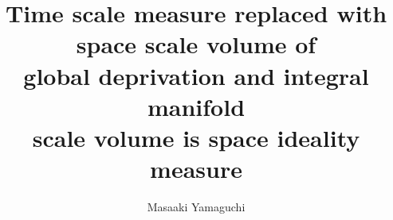 \documentclass{jsarticle}
\begin{document}
\title{Time scale measure replaced with space scale volume of \\
global deprivation and integral manifold \\
scale volume is space ideality measure}
\author{Masaaki Yamaguchi}
\date{}
\maketitle

\newcommand{\variint}{%
	\begin{picture}(15,30)
		\put(0,0){
			$ \iint $}
		\put(0,5){\line(15,0){15}}
	\end{picture} %
}
   \newcommand{\squareiint}{%
	\begin{picture}(15,30)
		\put(0,0){
			$ \iint $}
		\put(0,5){$\text{\scalebox{2.0}[1]{$\square$}}$}
	\end{picture} %
}

  
   \newcommand{\dazanier}{%
	\begin{picture}(15,30)
		\put(0,0){
			$ \bigsqcup $}
		\put(4,3){$\text{\scalebox{1.0}[1]{$\top$}}$}
		\put(4,3){$\text{\scalebox{1.0}[1]{$\bot$}}$}
	\end{picture} %
}


\newcommand{\variiint}{%
	\begin{picture}(15,15)
		\put(0,0){
			$ \iiint $}
		\put(0,5){\line(15,0){20}}
	\end{picture} %
}



 \newcommand{\alearletter}{%
	 \begin{picture}(10,20)
		 \put(0,0){
			 $ \square $}
		 \put(0,0){\line(1,1){10}}
	 \end{picture} %
	 }

  \newcommand{\whitewithbodercircle}
  {\text{\textcircled{\phantom{\textbullet}}}
  \kern-0.9em\text{\textcircled{\phantom{}}}}
     

 
  \newcommand{\whitewithblack}{\text{\textcircled{\textbullet}}}
  \newcommand{\whitewithblacksquare}{\text{\fbox{\text{\rule{0.5em}
  {0.5em}}}}}
  \newcommand{\whitewithwhitesquare}{\text{\fbox{\text{\phantom
  {\rule{0.5em}{0.5em}}}}}}
 \newcommand{\whitewithbodercircleiiint}{%
	 \begin{picture}(30,45)
		 \put(0,0){\scalebox{2.0}[2]{$\whitewithbodercircle$}}
		 \put(0,0){\scalebox{2.0}[2]{$\iiint$}}
	 \end{picture}%
	 }
\newcommand{\whitewithbodercircleint}{%
	 \begin{picture}(30,45)
		 \put(0,0){\scalebox{2.0}[2]{$\whitewithbodercircle$}}
		 \put(0,0){\scalebox{2.0}[2]{$\int$}}
	 \end{picture}%
	 }
 \newcommand{\whitewithbodercirclevarint}{%
	 \begin{picture}(30,45)
		 \put(0,0){\scalebox{2.0}[2]{$\whitewithbodercircle$}}
		 \put(0,0){\scalebox{2.0}[2]{$\varint$}}
	 \end{picture}%
	 }
 
\end{document}
